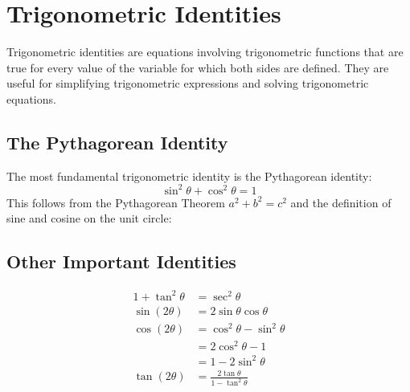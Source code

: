 \documentclass[12pt]{article}
\begin{document}
\newpage

\section*{Trigonometric Identities}
Trigonometric identities are equations involving trigonometric functions that are true for every value of the variable for which both sides are defined. They are  useful for simplifying trigonometric expressions and solving trigonometric equations.

\vfill

\subsection*{The Pythagorean Identity}
The most fundamental trigonometric identity is the Pythagorean identity:
$$\sin^2 \theta + \cos^2 \theta = 1$$
This follows from the Pythagorean Theorem $a^2+b^2=c^2$ and the definition of sine and cosine on the unit circle:
\begin{center}
\end{center}

\vfill

\subsection*{Other Important Identities}
\begin{align*}
1 + \tan^2 \theta &= \sec^2 \theta\\
\sin(2\theta) &= 2 \sin \theta \cos \theta \\
\cos(2\theta) &= \cos^2 \theta - \sin^2 \theta \\
&= 2\cos^2 \theta - 1 \\
&= 1 - 2\sin^2 \theta \\
\tan(2\theta) &= \frac{2 \tan \theta}{1 - \tan^2 \theta}
\end{align*}

\vfill
\end{document}
